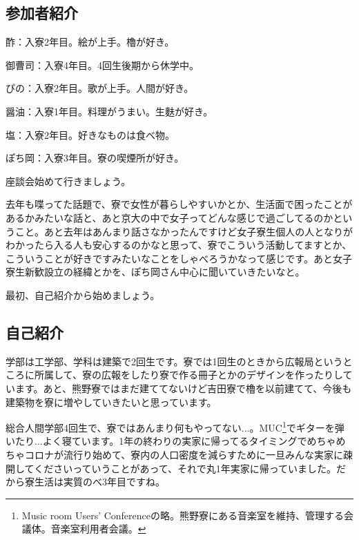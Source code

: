\begin{multicols}{2}

\subsection{参加者紹介}


\begin{boxnote}
  
    酢：入寮2年目。絵が上手。櫓が好き。

    御曹司：入寮4年目。4回生後期から休学中。

    ぴの：入寮2年目。歌が上手。人間が好き。

    醤油：入寮1年目。料理がうまい。生麩が好き。

    塩：入寮2年目。好きなものは食べ物。

    ぽち岡：入寮3年目。寮の喫煙所が好き。
  
\end{boxnote}





  座談会始めて行きましょう。

  去年も喋ってた話題で、寮で女性が暮らしやすいかとか、生活面で困ったことがあるかみたいな話と、あと京大の中で女子ってどんな感じで過ごしてるのかということ。あと去年はあんまり話さなかったんですけど女子寮生個人の人となりがわかったら入る人も安心するのかなと思って、寮でこういう活動してますとか、こういうことが好きですみたいなことをしゃべろうかなって感じです。あと女子寮生新歓設立の経緯とかを、ぽち岡さん中心に聞いていきたいなと。

  最初、自己紹介から始めましょう。







  \subsection{自己紹介}





  学部は工学部、学科は建築で2回生です。寮では1回生のときから広報局というところに所属して、寮の広報をしたり寮で作る冊子とかのデザインを作ったりしています。あと、熊野寮ではまだ建ててないけど吉田寮で櫓を以前建てて、今後も建築物を寮に増やしていきたいと思っています。



  総合人間学部4回生で、寮ではあんまり何もやってない...。MUC\footnote{Music room Users' Conferenceの略。熊野寮にある音楽室を維持、管理する会議体。音楽室利用者会議。}でギターを弾いたり...よく寝ています。1年の終わりの実家に帰ってるタイミングでめちゃめちゃコロナが流行り始めて、寮内の人口密度を減らすために一旦みんな実家に疎開してくださいっていうことがあって、それで丸1年実家に帰っていました。だから寮生活は実質のべ3年目ですね。




\end{multicols}
